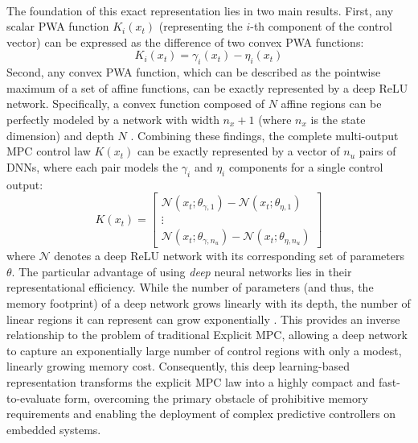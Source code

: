 \\
\noindent
The foundation of this exact representation lies in two main results. First, any scalar PWA function $K_i(x_t)$ (representing the $i$-th component of the control vector) can be expressed as the difference of two convex PWA functions:
\begin{equation}
    K_i(x_t) = \gamma_i(x_t) - \eta_i(x_t)
\end{equation}
Second, any convex PWA function, which can be described as the pointwise maximum of a set of affine functions, can be exactly represented by a deep ReLU network. Specifically, a convex function composed of $N$ affine regions can be perfectly modeled by a network with width $n_x + 1$ (where $n_x$ is the state dimension) and depth $N$ \cite{karg2020efficient}.
\noindent
Combining these findings, the complete multi-output MPC control law $K(x_t)$ can be exactly represented by a vector of $n_u$ pairs of DNNs, where each pair models the $\gamma_i$ and $\eta_i$ components for a single control output:
\begin{equation}
    K(x_t) = 
    \begin{bmatrix}
        \mathcal{N}(x_t; \theta_{\gamma,1}) - \mathcal{N}(x_t; \theta_{\eta,1}) \\
        \vdots \\
        \mathcal{N}(x_t; \theta_{\gamma,n_u}) - \mathcal{N}(x_t; \theta_{\eta,n_u})
    \end{bmatrix}
\end{equation}
where $\mathcal{N}$ denotes a deep ReLU network with its corresponding set of parameters $\theta$.
\noindent
The particular advantage of using \textit{deep} neural networks lies in their representational efficiency. While the number of parameters (and thus, the memory footprint) of a deep network grows linearly with its depth, the number of linear regions it can represent can grow exponentially \cite{karg2020efficient}. This provides an inverse relationship to the problem of traditional Explicit MPC, allowing a deep network to capture an exponentially large number of control regions with only a modest, linearly growing memory cost. Consequently, this deep learning-based representation transforms the explicit MPC law into a highly compact and fast-to-evaluate form, overcoming the primary obstacle of prohibitive memory requirements and enabling the deployment of complex predictive controllers on embedded systems.


